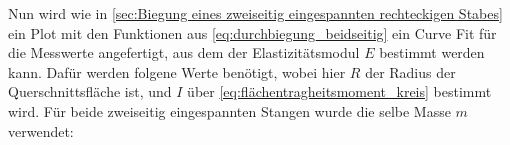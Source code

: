 \begin{table}
    \centering
    \caption{Messergebnisse zu dem zweiseitig eingespannten zylindrischen Stab}
    \label{tab:zweiseitig_rund}
\end{table}

Nun wird wie in \autoref{sec:Biegung eines zweiseitig eingespannten rechteckigen Stabes} ein Plot mit den Funktionen aus \autoref{eq:durchbiegung_beidseitig} ein Curve Fit für die Messwerte angefertigt, aus dem der Elastizitätsmodul $E$ bestimmt werden kann. Dafür werden folgene Werte benötigt, wobei hier $R$ der Radius der Querschnittsfläche ist, und $I$ über \autoref{eq:flächentragheitsmoment_kreis} bestimmt wird. Für beide zweiseitig eingespannten Stangen wurde die selbe Masse $m$ verwendet:

